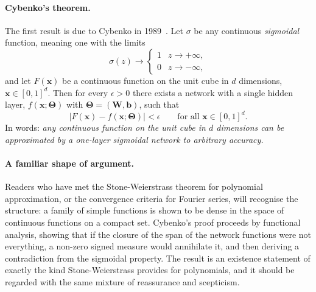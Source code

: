 \paragraph{Cybenko's theorem.}
The first result is due to Cybenko in 1989~\cite{cybenko1989}.  Let $\sigma$ be
any continuous \emph{sigmoidal} function, meaning one with the limits
\begin{equation}
  \sigma(z) \longrightarrow
  \begin{cases}
    1 & z\rightarrow+\infty,\\
    0 & z\rightarrow-\infty,
  \end{cases}
  \label{eq:8-sigmoidal}
\end{equation}
and let $F(\bm{x})$ be a continuous function on the unit cube in $d$
dimensions, $\bm{x}\in[0,1]^{d}$.  Then for every $\epsilon>0$ there exists a
network with a single hidden layer,
$f(\bm{x};\bm{\Theta})$ with $\bm{\Theta}=(\bm{W},\bm{b})$, such that
\begin{equation}
  \left|F(\bm{x})-f(\bm{x};\bm{\Theta})\right| < \epsilon
  \qquad\text{for all }\bm{x}\in[0,1]^{d} .
  \label{eq:8-cybenko}
\end{equation}
In words: \emph{any continuous function on the unit cube in $d$ dimensions can
be approximated by a one-layer sigmoidal network to arbitrary accuracy.}

\paragraph{A familiar shape of argument.}
Readers who have met the Stone-Weierstrass theorem for polynomial
approximation, or the convergence criteria for Fourier series, will recognise
the structure: a family of simple functions is shown to be dense in the space
of continuous functions on a compact set.  Cybenko's proof proceeds by
functional analysis, showing that if the closure of the span of the network
functions were not everything, a non-zero signed measure would annihilate it,
and then deriving a contradiction from the sigmoidal property.  The result is
an existence statement of exactly the kind Stone-Weierstrass provides for
polynomials, and it should be regarded with the same mixture of reassurance and
scepticism.


